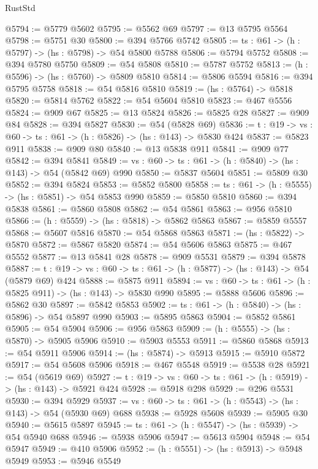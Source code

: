 \begin{lexlean}{RustStd}
\begin{coremodule}
{\begin{coremodule}
{{{{{{{{{{@5794 := @5779 @5602
@5795 := @5562 @69
@5797 := @13 @5795 @5564
@5798 := @5751 @30
@5800 := @394 @5766 @5742
@5805 := {ts : @61} -> (h : @5797) -> (hs : @5798) -> @54 @5800 @5788
@5806 := @5794 @5752
@5808 := @394 @5780 @5750
@5809 := @54 @5808
@5810 := @5787 @5752
@5813 := (h : @5596) -> (hs : @5760) -> @5809 @5810
@5814 := @5806 @5594
@5816 := @394 @5795 @5758
@5818 := @54 @5816 @5810
@5819 := (hs : @5764) -> @5818
@5820 := @5814 @5762
@5822 := @54 @5604 @5810
@5823 := @467 @5556
@5824 := @909 @67
@5825 := @13 @5824
@5826 := @5825 @28
@5827 := @909 @84
@5828 := @394 @5827
@5830 := @54 (@5828 @69)
@5836 := {t : @19} -> {vs : @60} -> {ts : @61} -> (h : @5826) -> (hs : @143) -> @5830 @424
@5837 := @5823 @911
@5838 := @909 @80
@5840 := @13 @5838 @911
@5841 := @909 @77
@5842 := @394 @5841
@5849 := {vs : @60} -> {ts : @61} -> (h : @5840) -> (hs : @143) -> @54 (@5842 @69) @990
@5850 := @5837 @5604
@5851 := @5809 @30
@5852 := @394 @5824
@5853 := @5852 @5800
@5858 := {ts : @61} -> (h : @5555) -> (hs : @5851) -> @54 @5853 @990
@5859 := @5850 @5810
@5860 := @394 @5838
@5861 := @5860 @5808
@5862 := @54 @5861
@5863 := @956 @5810
@5866 := (h : @5559) -> (hs : @5818) -> @5862 @5863
@5867 := @5859 @5557
@5868 := @5607 @5816
@5870 := @54 @5868 @5863
@5871 := (hs : @5822) -> @5870
@5872 := @5867 @5820
@5874 := @54 @5606 @5863
@5875 := @467 @5552
@5877 := @13 @5841 @28
@5878 := @909 @5531
@5879 := @394 @5878
@5887 := {t : @19} -> {vs : @60} -> {ts : @61} -> (h : @5877) -> (hs : @143) -> @54 (@5879 @69) @424
@5888 := @5875 @911
@5894 := {vs : @60} -> {ts : @61} -> (h : @5825 @911) -> (hs : @143) -> @5830 @990
@5895 := @5888 @5606
@5896 := @5862 @30
@5897 := @5842 @5853
@5902 := {ts : @61} -> (h : @5840) -> (hs : @5896) -> @54 @5897 @990
@5903 := @5895 @5863
@5904 := @5852 @5861
@5905 := @54 @5904
@5906 := @956 @5863
@5909 := (h : @5555) -> (hs : @5870) -> @5905 @5906
@5910 := @5903 @5553
@5911 := @5860 @5868
@5913 := @54 @5911 @5906
@5914 := (hs : @5874) -> @5913
@5915 := @5910 @5872
@5917 := @54 @5608 @5906
@5918 := @467 @5548
@5919 := @5538 @28
@5921 := @54 (@5619 @69)
@5927 := {t : @19} -> {vs : @60} -> {ts : @61} -> (h : @5919) -> (hs : @143) -> @5921 @424
@5928 := @5918 @298
@5929 := @296 @5531
@5930 := @394 @5929
@5937 := {vs : @60} -> {ts : @61} -> (h : @5543) -> (hs : @143) -> @54 (@5930 @69) @688
@5938 := @5928 @5608
@5939 := @5905 @30
@5940 := @5615 @5897
@5945 := {ts : @61} -> (h : @5547) -> (hs : @5939) -> @54 @5940 @688
@5946 := @5938 @5906
@5947 := @5613 @5904
@5948 := @54 @5947
@5949 := @410 @5906
@5952 := (h : @5551) -> (hs : @5913) -> @5948 @5949
@5953 := @5946 @5549
}}}}}}}}}}
\end{coremodule}}
\end{coremodule}
\end{lexlean}
